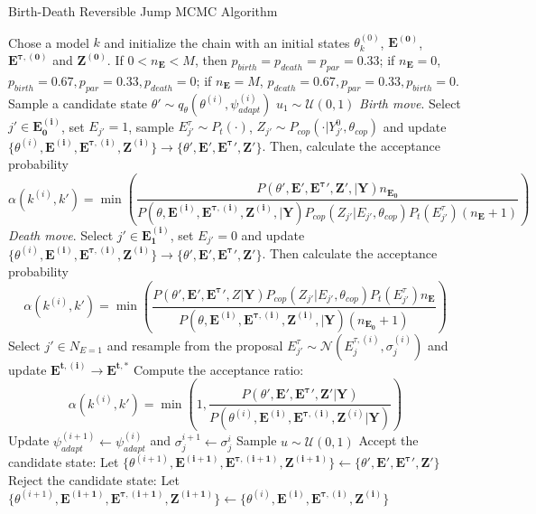 \begin{algorithm}[H]
\caption{Birth-Death Reversible Jump MCMC Algorithm}
\label{alg:rjmcmc_B}
\begin{algorithmic}[1]
    \State Chose a model $k$ and initialize the chain with an initial states $\theta^{(0)}_{k}$, $\mathbf{E^{(0)}}$, $\mathbf{E^{\tau, (0)}}$ and $\mathbf{Z^{(0)}}$. If $0 < n_\mathbf{E} < M$, then $p_{birth} = p_{death} = p_{par} = 0.33$; if $n_\mathbf{E} = 0$, $p_{birth} = 0.67, p_{par} = 0.33, p_{death} = 0$; if $n_\mathbf{E} = M$, $p_{death} = 0.67, p_{par} = 0.33, p_{birth} = 0$.
   	\State Sample a candidate state $\theta' \sim q_\theta(\theta^{(i)}, \psi^{(i)}_{adapt})$
    	\State $u_1 \sim \mathcal{U}(0, 1)$  
	 	\State \textit{Birth move}. Select $j' \in \mathbf{E^{(i)}_0}$, set $E_{j'} = 1$, sample $E^\tau_{j'} \sim P_t(\cdot)$, $Z_{j'}\sim P_{cop}(\cdot | Y_{j'}^0, \theta_{cop})$ and update $\{\theta^{(i)}, \mathbf{E^{(i)}}, \mathbf{E^{\tau, (i)}}, \mathbf{Z^{(i)}}\} \rightarrow \{\theta', \mathbf{E}', \mathbf{E^\tau}', \mathbf{Z}'\}$. Then, calculate the acceptance probability 
		$$\alpha(k^{(i)}, k') = \min\left(\frac{P(\theta', \mathbf{E}', \mathbf{E^\tau}', \mathbf{Z}', | \mathbf{Y})n_{\mathbf{E_0}}}{P(\theta, \mathbf{E^{(i)}}, \mathbf{E^{\tau, (i)}}, \mathbf{Z^{(i)}}, | \mathbf{Y})P_{cop}(Z_{j'} | E_{j'}, \theta_{cop})P_t(E^\tau_{j'})(n_{\mathbf{E}} + 1)} \right)$$
		\State \textit{Death move}. Select $j' \in \mathbf{E^{(i)}_1}$, set $E_{j'} = 0$ and update $\{\theta^{(i)}, \mathbf{E^{(i)}}, \mathbf{E^{\tau, (i)}}, \mathbf{Z^{(i)}}\} \rightarrow \{\theta', \mathbf{E}', \mathbf{E^\tau}', \mathbf{Z}'\}$. Then calculate the acceptance probability 
$$\alpha(k^{(i)}, k') = \min\left(\frac{P(\theta', \mathbf{E}', \mathbf{E^{\tau}}', \mathbf{} Z| \mathbf{Y})P_{cop}(Z_{j'} | E_{j'}, \theta_{cop})P_t(E^\tau_{j'})n_{\mathbf{E}}}{P(\theta, \mathbf{E^{(i)}}, \mathbf{E^{\tau, (i)}}, \mathbf{Z^{(i)}}, | \mathbf{Y})(n_{\mathbf{E_0}} + 1)} \right)$$
	\Else
        \State Select $j' \in N_{E = 1}$ and resample from the proposal $E_{j'}^{\tau} \sim \mathcal{N}\left(E_{j}^{\tau, (i)}, \sigma^{(i)}_{j}\right)$ and update $\mathbf{E^{t, (i)}} \rightarrow \mathbf{E^{t, *}}$
    	    \State Compute the acceptance ratio:
        		\[
        \alpha(k^{(i)}, k') = \min\left(1, \frac{P(\theta', \mathbf{E}', \mathbf{E^{\tau}}', \mathbf{Z}'|\mathbf{Y})}{P(\theta^{(i)}, \mathbf{E^{(i)}}, \mathbf{E^{\tau, (i)}}, \mathbf{Z}^{(i)}|\mathbf{Y})} \right)
        			\]
	\State Update $ \psi^{(i + 1)}_{adapt} \leftarrow \psi^{(i)}_{adapt}$ and $\sigma_j^{i + 1} \leftarrow \sigma_j^{i}$
        \EndIf 
		   \State Sample $u \sim \mathcal{U}(0, 1)$
            			\State Accept the candidate state: Let $\{\theta^{(i+1)}, \mathbf{E^{(i+1)}}, \mathbf{E^{\tau, (i+1)}}, \mathbf{Z^{(i+1)}}\} \leftarrow \{\theta', \mathbf{E}', \mathbf{E^\tau}', \mathbf{Z}'\}$
			\Else
				\State Reject the candidate state: Let $\{\theta^{(i+1)}, \mathbf{E^{(i+1)}}, \mathbf{E^{\tau, (i+1)}}, \mathbf{Z^{(i+1)}}\} \leftarrow \{\theta^{(i)}, \mathbf{E^{(i)}}, \mathbf{E^{\tau, (i)}}, \mathbf{Z^{(i)}}\}$


\end{algorithmic}
\end{algorithm}
